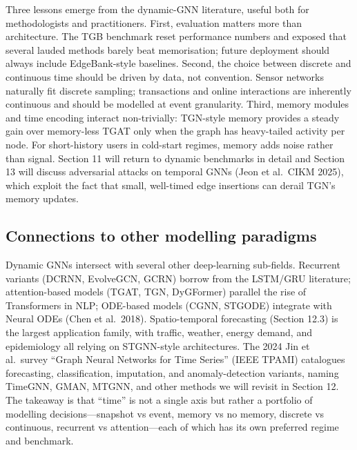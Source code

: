\documentclass{article}
\begin{document}
Three lessons emerge from the dynamic-GNN literature, useful both for methodologists and practitioners. First, evaluation matters more than architecture. The TGB benchmark reset performance numbers and exposed that several lauded methods barely beat memorisation; future deployment should always include EdgeBank-style baselines. Second, the choice between discrete and continuous time should be driven by data, not convention. Sensor networks naturally fit discrete sampling; transactions and online interactions are inherently continuous and should be modelled at event granularity. Third, memory modules and time encoding interact non-trivially: TGN-style memory provides a steady gain over memory-less TGAT only when the graph has heavy-tailed activity per node. For short-history users in cold-start regimes, memory adds noise rather than signal. Section 11 will return to dynamic benchmarks in detail and Section 13 will discuss adversarial attacks on temporal GNNs (Jeon et al.~CIKM 2025), which exploit the fact that small, well-timed edge insertions can derail TGN's memory updates.

\subsection{Connections to other modelling paradigms}\label{connections-to-other-modelling-paradigms}

Dynamic GNNs intersect with several other deep-learning sub-fields. Recurrent variants (DCRNN, EvolveGCN, GCRN) borrow from the LSTM/GRU literature; attention-based models (TGAT, TGN, DyGFormer) parallel the rise of Transformers in NLP; ODE-based models (CGNN, STGODE) integrate with Neural ODEs (Chen et al.~2018). Spatio-temporal forecasting (Section 12.3) is the largest application family, with traffic, weather, energy demand, and epidemiology all relying on STGNN-style architectures. The 2024 Jin et al.~survey ``Graph Neural Networks for Time Series'' (IEEE TPAMI) catalogues forecasting, classification, imputation, and anomaly-detection variants, naming TimeGNN, GMAN, MTGNN, and other methods we will revisit in Section 12. The takeaway is that ``time'' is not a single axis but rather a portfolio of modelling decisions---snapshot vs event, memory vs no memory, discrete vs continuous, recurrent vs attention---each of which has its own preferred regime and benchmark.
\end{document}

